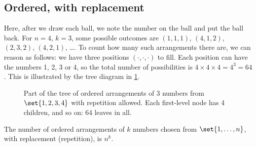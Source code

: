 \subsection{Ordered, with replacement}\label{sec:count-ordered-with}

Here, after we draw each ball, we note the number on the ball and put the ball back. For $n = 4$, $k = 3$, some possible outcomes are $(1,1,1)$, $(4,1,2)$, $(2,3,2)$, $(4,2,1)$, \ldots. To count how many such arrangements there are, we can reason as follows: we have three positions $(\cdot, \cdot, \cdot)$ to fill. Each position can have the numbers 1, 2, 3 or 4, so the total number of possibilities is $4 \times 4 \times 4 = 4^3 = 64$. This is illustrated by the tree diagram in \cref{fig:tree-with-duplication}.

\begin{figure}[ht]
\centering
{}
\caption{Part of the tree of ordered arrangements of 3 numbers from $\set{1, 2, 3, 4}$ with repetition allowed. Each first-level node has 4 children, and so on: 64 leaves in all.}
\label{fig:tree-with-duplication}
\end{figure}

\begin{theorem}\label{thm:count-ordered-with-replacement}
The number of ordered arrangements of $k$ numbers chosen from $\set{1, \ldots, n}$, with replacement (repetition), is $n^k$.
\end{theorem}

